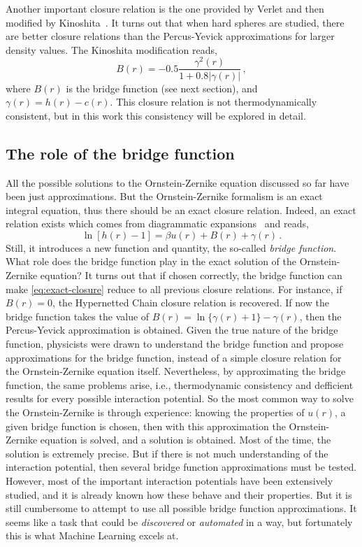 Another important closure relation is the one provided by Verlet and then modified by
Kinoshita~\cite{kinoshitaInteractionSurfacesSolvophobicity2003}. It turns out that
when hard spheres are studied, there are better closure relations than the
Percus-Yevick approximations for larger density values.
The Kinoshita modification reads,
\begin{equation}
    B(r) = - 0.5 \frac{\gamma^2 (r)}{1 + 0.8 \lvert \gamma (r) \rvert} \, ,
    \label{eq:kinoshita}
\end{equation}
where $B(r)$ is the bridge function (see next section), and $\gamma(r)=h(r)-c(r)$.
This closure relation is not thermodynamically consistent, but in this work this
consistency will be explored in detail.

\subsection{The role of the bridge function}
All the possible solutions to the Ornstein-Zernike equation discussed so far 
have been just approximations.
But the Ornstein-Zernike formalism is an exact integral equation, thus there should be an
exact closure relation. Indeed, an exact relation exists which comes from diagrammatic
expansions~\cite{hansenTheorySimpleLiquids2013} and reads,
\begin{equation}
    \ln{\left[h(r) - 1\right]} = \beta u(r) + B(r) + \gamma(r) \, .
    \label{eq:exact-closure}
\end{equation}
Still, it introduces a new function and quantity, the so-called \emph{bridge function}.
What role does the bridge function play in the exact solution of the Ornstein-Zernike
equation? It turns out that if chosen correctly, the bridge function can make
\autoref{eq:exact-closure} reduce to all previous closure relations. For instance,
if $B(r)=0$, the Hypernetted Chain closure relation is recovered. If now the bridge
function takes the value of $B(r)=\ln{ \{\gamma(r) + 1\} }-\gamma(r)$, then the 
Percus-Yevick approximation is obtained. Given the true nature of the bridge function,
physicists were drawn to understand the bridge function and propose approximations for
the bridge function, instead of a simple closure relation for the Ornstein-Zernike
equation itself. Nevertheless, by approximating the bridge function, the same problems
arise, i.e., thermodynamic consistency and defficient results for every possible
interaction potential. So the most common way to solve the Ornstein-Zernike is through
experience: knowing the properties of $u(r)$, a given bridge function is chosen,
then with this approximation the Ornstein-Zernike equation is solved, and a solution is
obtained. Most of the time, the solution is extremely precise. But if there is not
much understanding of the interaction potential, then several bridge function approximations
must be tested. However, most of the important interaction potentials have been
extensively studied, and it is already known how these behave and their properties.
But it is still cumbersome to attempt to use all possible bridge function approximations.
It seems like a task that could be \emph{discovered} or \emph{automated} in a way, but
fortunately this is what Machine Learning excels at.